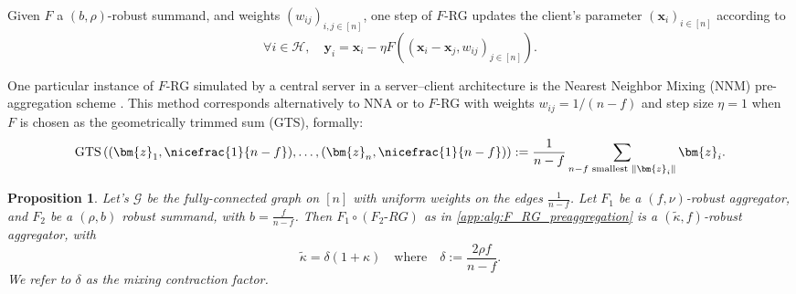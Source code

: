 \documentclass{article}
\def\vx{{\bm{x}}}
\def\vy{{\bm{y}}}
\def\vz{{\bm{z}}}
\newcommand{\cG}{\mathcal{G}}
\newcommand{\cH}{\mathcal{H}}
\theoremstyle{plain}
\newtheorem{proposition}[theorem]{Proposition}
\theoremstyle{definition}
\theoremstyle{remark}
\begin{document}
Given $F$ a $(b,\rho)$-robust summand, and weights $(w_{ij})_{i,j\in [n]}$, one step of $F$-RG updates the client's parameter $(\vx_i)_{i \in [n]}$ according to
\[
\forall i \in \cH,\quad  \vy_i = \vx_i - \eta F( (\vx_i - \vx_j, w_{ij})_{j \in [n]}).
\]

One particular instance of $F$-RG simulated by a central server in a server–client architecture is the Nearest Neighbor Mixing (NNM) pre-aggregation scheme \citep{allouah2023fixing}. This method corresponds alternatively to NNA \citep{farhadkhani2023robust} or to $F$-RG with weights $w_{ij} = 1/(n-f)$ and step size $\eta = 1$ when $F$ is chosen as the geometrically trimmed sum (GTS), formally:
\[
\mathrm{GTS}\left((\vz_1,\nicefrac{1}{n-f}),\ldots, (\vz_n, \nicefrac{1}{n-f}) \right) := \frac{1}{n-f}\sum_{n-f \text{ smallest } \|\vz_i\|}\vz_i.
\]



\begin{proposition}
    Let's $\cG$ be the fully-connected graph on $[n]$ with uniform weights on the edges $\frac{1}{n-f}$. Let $F_1$ be a $(f,\nu)$-robust aggregator, and $F_2$ be a $(\rho,b)$ robust summand, with $b=\frac{f}{n-f}$. Then $F_1 \circ(F_2\text{-}RG)$ as in \cref{app:alg:F_RG_preaggregation} is a $(\tilde{\kappa},f)$-robust aggregator, with 
    \[
    \tilde{\kappa} = \delta (1+\kappa)\quad \text{where} \quad \delta := \frac{2\rho f}{n-f}.
    \]
    We refer to $\delta$ as the mixing contraction factor.
\end{proposition}
\end{document}
